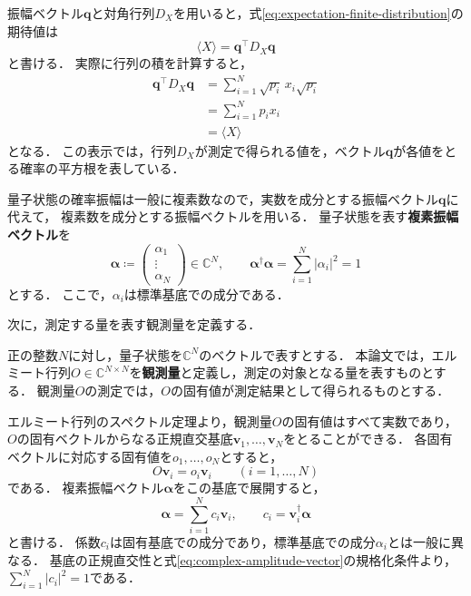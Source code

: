 振幅ベクトル$\bm{q}$と対角行列$D_X$を用いると，式\eqref{eq:expectation-finite-distribution}の期待値は
\begin{equation}
  \langle X\rangle=\bm{q}^\top D_X \bm{q}
  \label{eq:classical-expectation-matrix-form}
\end{equation}
と書ける．
実際に行列の積を計算すると，
\begin{equation*}
  \begin{aligned}
    \bm{q}^\top D_X \bm{q}
    &=\sum_{i=1}^{N}\sqrt{p_i}\,x_i\sqrt{p_i}\\
    &=\sum_{i=1}^{N}p_i x_i\\
    &=\langle X\rangle
  \end{aligned}
\end{equation*}
となる．
この表示では，行列$D_X$が測定で得られる値を，ベクトル$\bm{q}$が各値をとる確率の平方根を表している．

量子状態の確率振幅は一般に複素数なので，実数を成分とする振幅ベクトル$\bm{q}$に代えて，
複素数を成分とする振幅ベクトルを用いる．
量子状態を表す\textbf{複素振幅ベクトル}を
\begin{equation}
  \bm{\alpha}\coloneq
  \begin{pmatrix}\alpha_1\\\vdots\\\alpha_N\end{pmatrix}
  \in\mathbb C^N,
  \qquad
  \bm{\alpha}^{\dagger}\bm{\alpha}
  =\sum_{i=1}^{N}|\alpha_i|^2=1
  \label{eq:complex-amplitude-vector}
\end{equation}
とする．
ここで，$\alpha_i$は標準基底での成分である．

次に，測定する量を表す観測量を定義する．

\begin{defi}[観測量]
\label{def:observable}
正の整数$N$に対し，量子状態を$\mathbb C^N$のベクトルで表すとする．
本論文では，エルミート行列$O\in\mathbb C^{N\times N}$を\textbf{観測量}と定義し，測定の対象となる量を表すものとする．
観測量$O$の測定では，$O$の固有値が測定結果として得られるものとする．
\end{defi}

エルミート行列のスペクトル定理より，観測量$O$の固有値はすべて実数であり，
$O$の固有ベクトルからなる正規直交基底$\bm{v}_1,\ldots,\bm{v}_N$をとることができる．
各固有ベクトルに対応する固有値を$o_1,\ldots,o_N$とすると，
\begin{equation*}
  O\bm{v}_i=o_i\bm{v}_i
  \qquad(i=1,\ldots,N)
\end{equation*}
である．
複素振幅ベクトル$\bm{\alpha}$をこの基底で展開すると，
\begin{equation}
  \bm{\alpha}=\sum_{i=1}^{N}c_i\bm{v}_i,
  \qquad
  c_i=\bm{v}_i^{\dagger}\bm{\alpha}
  \label{eq:state-in-observable-eigenbasis}
\end{equation}
と書ける．
係数$c_i$は固有基底での成分であり，標準基底での成分$\alpha_i$とは一般に異なる．
基底の正規直交性と式\eqref{eq:complex-amplitude-vector}の規格化条件より，
$\sum_{i=1}^{N}|c_i|^2=1$である．

